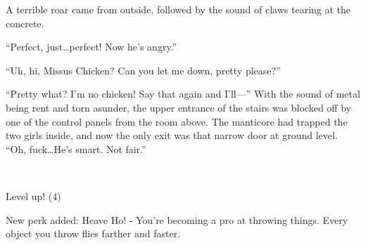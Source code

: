 A terrible roar came from outside, followed by the sound of claws tearing at the concrete.

``Perfect, just\dots perfect! Now he's angry.''

``Uh, hi, Missus Chicken? Can you let me down, pretty please?''

``Pretty what? I'm no chicken! Say that again and I'll---'' With the sound of metal being rent and torn asunder, the upper entrance of the stairs was blocked off by one of the control panels from the room above. The manticore had trapped the two girls inside, and now the only exit was that narrow door at ground level. ``Oh, fuck\dots He's smart. Not fair.''

~\vfill

\begin{engnote}
		Level up! (4)
	
		New perk added: Heave Ho! - You're becoming a pro at throwing things. Every object you throw flies farther and faster.
\end{engnote}


